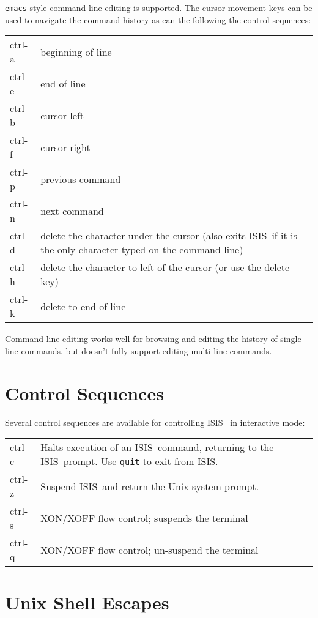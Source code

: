 \documentclass{book}
\newcommand{\isisx}{{\sc ISIS~}}
\begin{document}
{\tt emacs}-style command line editing is supported.  The cursor
movement keys can be used to navigate the command history as can
the following the control sequences:

\begin{center}
\begin{tabular}{|l|p{4.5in}|}
\hline
ctrl-a  &  beginning of line \\
ctrl-e  &  end of line \\
ctrl-b  &  cursor left \\
ctrl-f  &  cursor right \\
ctrl-p  &  previous command \\
ctrl-n  &  next command \\
ctrl-d  &  delete the character under the cursor (also exits \isisx if it
          is the only character typed on the command line) \\
ctrl-h  &  delete the character to left of the cursor (or use the delete key) \\
ctrl-k  &  delete to end of line \\
\hline
\end{tabular}
\end{center}

Command line editing works well for browsing and editing the history
of single-line commands, but doesn't fully support editing
multi-line commands.

\section{Control Sequences}

Several control sequences are available for controlling \isisx
in interactive mode:

\begin{center}
\begin{tabular}{|l|p{4.5in}|}
\hline
ctrl-c  &  Halts execution of an \isisx command, returning to the \isisx prompt.
           Use {\tt quit} to exit from ISIS. \\
ctrl-z  &  Suspend \isisx and return the Unix system prompt. \\
ctrl-s  &  XON/XOFF flow control; suspends the terminal\\
ctrl-q  &  XON/XOFF flow control; un-suspend the terminal\\
\hline
\end{tabular}
\end{center}

\section{Unix Shell Escapes}
\end{document}
